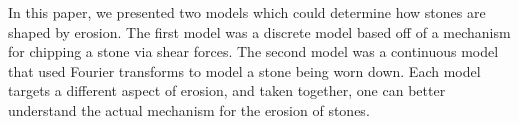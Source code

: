 In this paper, we presented two models which could determine how stones are shaped by erosion. The first model was a discrete model based off of a mechanism for chipping a stone via shear forces. The second model was a continuous model that used Fourier transforms to model a stone being worn down. Each model targets a different aspect of erosion, and taken together, one can better understand the actual mechanism for the erosion of stones.
